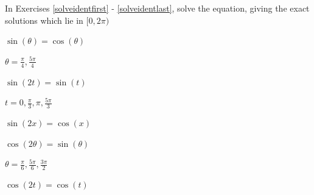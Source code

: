 \documentclass{ximera}
\begin{document}
\begin{question}
In Exercises \ref{solveidentfirst} - \ref{solveidentlast}, solve the equation, giving the exact solutions which lie in $[0, 2\pi)$

\begin{problem} \label{solveidentfirst}
$\sin \left( \theta \right) = \cos \left( \theta \right)$ 

\begin{solution}
$\theta = \frac{\pi}{4}, \frac{5\pi}{4}$
\end{solution}
\end{problem}

\begin{problem}
$\sin \left( 2t \right) = \sin \left( t \right)$

\begin{solution}
$t = 0, \frac{\pi}{3}, \pi, \frac{5\pi}{3}$
\end{solution}
\end{problem}

\begin{problem}
$\sin \left( 2x \right) = \cos \left( x \right)$

\begin{selectAll}
  \end{selectAll}

\end{problem}

\begin{problem}
$\cos \left( 2\theta \right) = \sin \left( \theta \right)$

\begin{solution}
$\theta = \frac{\pi}{6}, \frac{5\pi}{6}, \frac{3\pi}{2}$
\end{solution}
\end{problem}

\begin{problem}
$\cos \left( 2t \right) = \cos \left( t \right)$

\begin{selectAll}
  \end{selectAll}


\end{problem}
\end{question}
\end{document}
